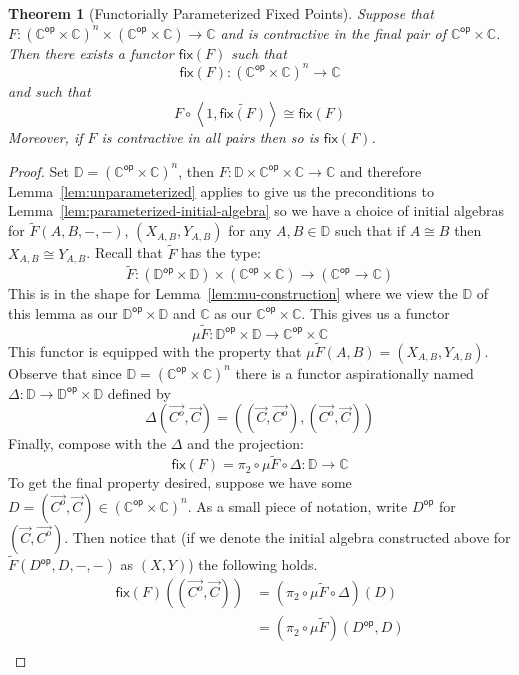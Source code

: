 \documentclass{amsart}
\newtheorem{thm}{Theorem}
\newcommand{\Ccat}{\ensuremath{\mathbb{C}}}
\newcommand{\Dcat}{\ensuremath{\mathbb{D}}}
\newcommand{\op}[1]{\ensuremath{#1^{\mathsf{op}}}}
\newcommand{\symmetrize}[1]{\ensuremath{\widetilde{#1}}}
\newcommand{\pair}[2]{\ensuremath{\left\langle #1, #2 \right\rangle}}
\newcommand{\fix}[1]{\ensuremath{\mathsf{fix}(#1)}}
\newcommand{\arr}[1]{\ensuremath{\overrightarrow{#1}}}
\begin{document}
\begin{thm}[Functorially Parameterized Fixed Points]
  Suppose that
  $F : (\op{\Ccat} \times \Ccat)^n \times (\op{\Ccat} \times \Ccat) \to \Ccat$
  and is contractive in the final pair of $\op{\Ccat} \times
  \Ccat$. Then there exists a functor $\fix{F}$ such that
  \[
    \fix{F} : (\op{\Ccat} \times \Ccat)^n \to \Ccat
  \]
  and such that
  \[
    F \circ \pair{1}{\symmetrize{\fix{F}}} \cong \fix{F}
  \]
  Moreover, if $F$ is contractive in all pairs then so is $\fix{F}$.
\end{thm}
\begin{proof}
  Set $\Dcat = (\op{\Ccat} \times \Ccat)^n$, then
  $F : \Dcat \times \op{\Ccat} \times \Ccat \to \Ccat$ and therefore
  Lemma~\ref{lem:unparameterized} applies to give us the preconditions
  to Lemma~\ref{lem:parameterized-initial-algebra} so we have a choice
  of initial algebras for $\symmetrize{F}(A, B, -, -)$,
  $(X_{A, B}, Y_{A, B})$ for any $A, B \in \Dcat$ such that if
  $A \cong B$ then $X_{A, B} \cong Y_{A, B}$. Recall that
  $\symmetrize{F}$ has the type:
  \[
    \symmetrize{F} :
    (\op{\Dcat} \times \Dcat) \times (\op{\Ccat} \times \Ccat) \to (\op{\Ccat} \to \Ccat)
  \]
  This is in the shape for Lemma~\ref{lem:mu-construction} where we
  view the $\Dcat$ of this lemma as our $\op{\Dcat} \times \Dcat$ and
  $\Ccat$ as our $\op{\Ccat} \times \Ccat$. This gives us a functor
  \[
    \mu \symmetrize{F} :
    \op{\Dcat} \times \Dcat \to \op{\Ccat} \times \Ccat
  \]
  This functor is equipped with the property that
  $\mu \symmetrize{F}(A, B) = (X_{A, B}, Y_{A, B})$. Observe that since
  $\Dcat = (\op{\Ccat} \times \Ccat)^n$ there is a functor
  aspirationally named $\Delta : \Dcat \to \op{\Dcat} \times \Dcat$
  defined by
  \[
    \Delta(\arr{C^o}, \arr{C}) = ((\arr{C}, \arr{C^o}), (\arr{C^o}, \arr{C}))
  \]
  Finally, compose with the $\Delta$ and the projection:
  \[
    \fix{F} = \pi_2 \circ \mu \symmetrize{F} \circ \Delta
    : \Dcat \to \Ccat
  \]
  To get the final property desired, suppose we have some
  $D = (\vec{C^o}, \arr{C}) \in (\op{\Ccat} \times \Ccat)^n$. As a
  small piece of notation, write $\op{D}$ for $(\vec{C}, \arr{C^o})$.
  Then notice that (if we denote the initial algebra constructed above
  for $\symmetrize{F}(\op{D}, D, -, -)$ as $(X, Y)$) the following
  holds.
  \begin{align*}
    \fix{F}((\arr{C^o}, \arr{C}))
    &= (\pi_2 \circ \mu \symmetrize{F} \circ \Delta)(D)\\
    &= (\pi_2 \circ \mu \symmetrize{F})(\op{D}, D)\\

\end{align*}
\end{proof}
\end{document}
